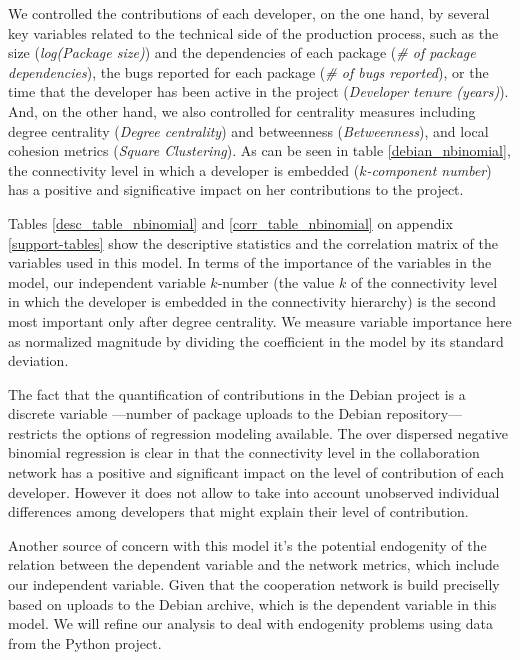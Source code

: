 We controlled the contributions of each developer, on the one hand, by several key variables related to the technical side of the production process, such as the size (\emph{log(Package size)}) and the dependencies of each package (\emph{\# of package dependencies}), the bugs reported for each package (\emph{\# of bugs reported}), or the time that the developer has been active in the project (\emph{Developer tenure (years)}). And, on the other hand, we also controlled for centrality measures including degree centrality (\emph{Degree centrality}) and betweenness (\emph{Betweenness}), and local cohesion metrics (\emph{Square Clustering}). As can be seen in table \ref{debian_nbinomial}, the connectivity level in which a developer is embedded (\emph{$k$-component number}) has a positive and significative impact on her contributions to the project.



Tables \ref{desc_table_nbinomial} and \ref{corr_table_nbinomial} on appendix \ref{support-tables} show the descriptive statistics and the correlation matrix of the variables used in this model. In terms of the importance of the variables in the model, our independent variable $k$-number (the value $k$ of the connectivity level in which the developer is embedded in the connectivity hierarchy) is the second most important only after degree centrality. We measure variable importance here as normalized magnitude by dividing the coefficient in the model by its standard deviation.
 
The fact that the quantification of contributions in the Debian project is a discrete variable ---number of package uploads to the Debian repository--- restricts the options of regression modeling available. The over dispersed negative binomial regression is clear in that the connectivity level in the collaboration network has a positive and significant impact on the level of contribution of each developer. However it does not allow to take into account unobserved individual differences among developers that might explain their level of contribution.

Another source of concern with this model it's the potential endogenity of the relation between the dependent variable and the network metrics, which include our independent variable. Given that the cooperation network is build preciselly based on uploads to the Debian archive, which is the dependent variable in this model. We will refine our analysis to deal with endogenity problems using data from the Python project. 

